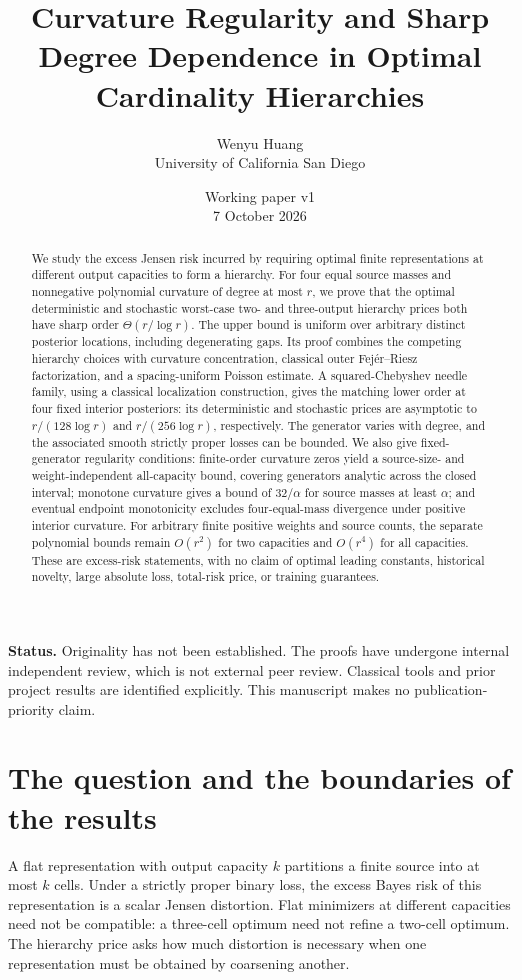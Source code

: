 \documentclass[11pt]{article}
\title{Curvature Regularity and Sharp Degree Dependence in Optimal Cardinality Hierarchies}
\author{Wenyu Huang\\\small University of California San Diego}
\date{Working paper v1\\7 October 2026}
\theoremstyle{definition}\newtheorem{definition}[theorem]{Definition}
\theoremstyle{remark}\newtheorem{remark}[theorem]{Remark}
\begin{document}
\maketitle
\begin{center}\begin{minipage}{0.93\textwidth}\small
\textbf{Status.} Originality has not been established. The proofs have undergone internal independent review, which is not external peer review. Classical tools and prior project results are identified explicitly. This manuscript makes no publication-priority claim.
\end{minipage}\end{center}
\begin{abstract}
We study the excess Jensen risk incurred by requiring optimal finite representations at different output capacities to form a hierarchy. For four equal source masses and nonnegative polynomial curvature of degree at most $r$, we prove that the optimal deterministic and stochastic worst-case two- and three-output hierarchy prices both have sharp order $\Theta(r/\log r)$. The upper bound is uniform over arbitrary distinct posterior locations, including degenerating gaps. Its proof combines the competing hierarchy choices with curvature concentration, classical outer Fej\'er--Riesz factorization, and a spacing-uniform Poisson estimate. A squared-Chebyshev needle family, using a classical localization construction, gives the matching lower order at four fixed interior posteriors: its deterministic and stochastic prices are asymptotic to $r/(128\log r)$ and $r/(256\log r)$, respectively. The generator varies with degree, and the associated smooth strictly proper losses can be bounded. We also give fixed-generator regularity conditions: finite-order curvature zeros yield a source-size- and weight-independent all-capacity bound, covering generators analytic across the closed interval; monotone curvature gives a bound of $32/\alpha$ for source masses at least $\alpha$; and eventual endpoint monotonicity excludes four-equal-mass divergence under positive interior curvature. For arbitrary finite positive weights and source counts, the separate polynomial bounds remain $O(r^2)$ for two capacities and $O(r^4)$ for all capacities. These are excess-risk statements, with no claim of optimal leading constants, historical novelty, large absolute loss, total-risk price, or training guarantees.
\end{abstract}

\section{The question and the boundaries of the results}
A flat representation with output capacity $k$ partitions a finite source into at most $k$ cells. Under a strictly proper binary loss, the excess Bayes risk of this representation is a scalar Jensen distortion. Flat minimizers at different capacities need not be compatible: a three-cell optimum need not refine a two-cell optimum. The hierarchy price asks how much distortion is necessary when one representation must be obtained by coarsening another.
\end{document}
